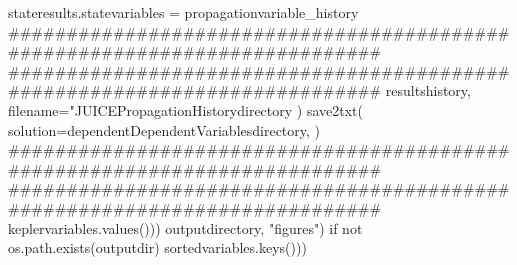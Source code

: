 {}stateresults.statevariables = propagationvariable_history\markdownRendererInterblockSeparator
{}###########################################################################\markdownRendererInterblockSeparator
{}
\markdownRendererSectionEnd \markdownRendererSectionBegin
{}\markdownRendererInterblockSeparator
{}########################################################################### resultshistory, filename="JUICEPropagationHistorydirectory ) save2txt( solution=dependentDependentVariablesdirectory, )\markdownRendererInterblockSeparator
{}###########################################################################\markdownRendererInterblockSeparator
{}
\markdownRendererSectionEnd \markdownRendererSectionBegin
{}\markdownRendererInterblockSeparator
{}###########################################################################\markdownRendererInterblockSeparator
{}
\markdownRendererSectionEnd \markdownRendererSectionBegin
{}\markdownRendererInterblockSeparator
{}keplervariables.values()))\markdownRendererInterblockSeparator
{}
\markdownRendererSectionEnd \markdownRendererSectionBegin
{}\markdownRendererInterblockSeparator
{}
\markdownRendererSectionEnd \markdownRendererSectionBegin
{}\markdownRendererInterblockSeparator
{}outputdirectory, "figures") if not os.path.exists(outputdir)\markdownRendererInterblockSeparator
{}
\markdownRendererSectionEnd \markdownRendererSectionBegin
{}\markdownRendererInterblockSeparator
{}
\markdownRendererSectionEnd \markdownRendererSectionBegin
{}\markdownRendererInterblockSeparator
{}sortedvariables.keys()))\markdownRendererInterblockSeparator
